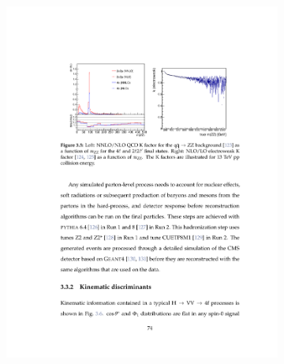 \begin{figure}[!hbt]
\centering
\begin{subfigure}[t]{0.45\textwidth}
    \includegraphics[width=\textwidth]{figures/NNLO_QCD_Kfactor.pdf}
\end{subfigure}
\begin{subfigure}[t]{0.45\textwidth}

\end{subfigure}
\end{figure}
